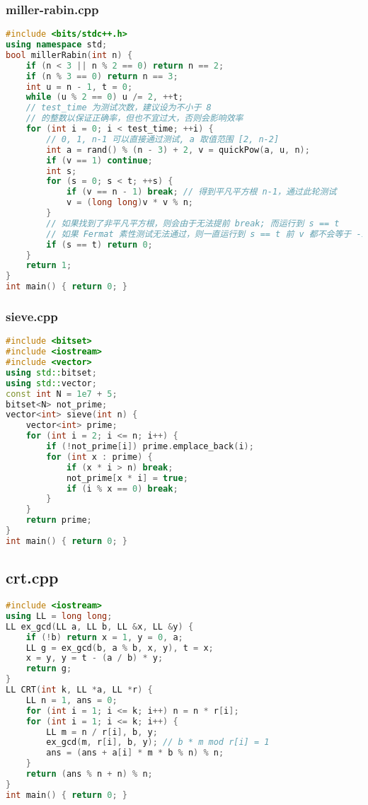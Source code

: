 \documentclass[9pt, a4paper, oneside]{book}
\begin{document}
\subsubsection{miller-rabin.cpp}
\begin{lstlisting}[language={C++}]
#include <bits/stdc++.h>
using namespace std;
bool millerRabin(int n) {
    if (n < 3 || n % 2 == 0) return n == 2;
    if (n % 3 == 0) return n == 3;
    int u = n - 1, t = 0;
    while (u % 2 == 0) u /= 2, ++t;
    // test_time 为测试次数，建议设为不小于 8
    // 的整数以保证正确率，但也不宜过大，否则会影响效率
    for (int i = 0; i < test_time; ++i) {
        // 0, 1, n-1 可以直接通过测试, a 取值范围 [2, n-2]
        int a = rand() % (n - 3) + 2, v = quickPow(a, u, n);
        if (v == 1) continue;
        int s;
        for (s = 0; s < t; ++s) {
            if (v == n - 1) break; // 得到平凡平方根 n-1，通过此轮测试
            v = (long long)v * v % n;
        }
        // 如果找到了非平凡平方根，则会由于无法提前 break; 而运行到 s == t
        // 如果 Fermat 素性测试无法通过，则一直运行到 s == t 前 v 都不会等于 -1
        if (s == t) return 0;
    }
    return 1;
}
int main() { return 0; }\end{lstlisting}
\subsubsection{sieve.cpp}
\begin{lstlisting}[language={C++}]
#include <bitset>
#include <iostream>
#include <vector>
using std::bitset;
using std::vector;
const int N = 1e7 + 5;
bitset<N> not_prime;
vector<int> sieve(int n) {
    vector<int> prime;
    for (int i = 2; i <= n; i++) {
        if (!not_prime[i]) prime.emplace_back(i);
        for (int x : prime) {
            if (x * i > n) break;
            not_prime[x * i] = true;
            if (i % x == 0) break;
        }
    }
    return prime;
}
int main() { return 0; }\end{lstlisting}
\subsection{crt.cpp}
\begin{lstlisting}[language={C++}]
#include <iostream>
using LL = long long;
LL ex_gcd(LL a, LL b, LL &x, LL &y) {
    if (!b) return x = 1, y = 0, a;
    LL g = ex_gcd(b, a % b, x, y), t = x;
    x = y, y = t - (a / b) * y;
    return g;
}
LL CRT(int k, LL *a, LL *r) {
    LL n = 1, ans = 0;
    for (int i = 1; i <= k; i++) n = n * r[i];
    for (int i = 1; i <= k; i++) {
        LL m = n / r[i], b, y;
        ex_gcd(m, r[i], b, y); // b * m mod r[i] = 1
        ans = (ans + a[i] * m * b % n) % n;
    }
    return (ans % n + n) % n;
}
int main() { return 0; }\end{lstlisting}
\end{document}
